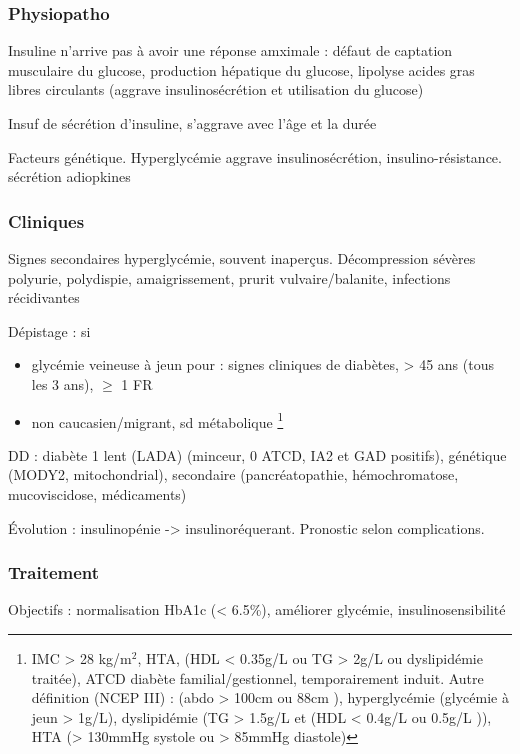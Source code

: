 \documentclass[11pt]{article}
\begin{document}
\subsubsection{Physiopatho}
\label{sec:org3b53937}
Insuline n'arrive pas à avoir une réponse amximale : défaut de captation
musculaire du glucose, \inc production hépatique du glucose, lipolyse \inc acides gras
libres circulants \thus (aggrave \dec insulinosécrétion et utilisation du glucose)

Insuf de sécrétion d'insuline, s'aggrave avec l'âge et la durée

Facteurs génétique. Hyperglycémie aggrave insulinosécrétion,
insulino-résistance. \dec sécrétion adiopkines

\subsubsection{Cliniques}
\label{sec:org6215526}
Signes secondaires hyperglycémie, souvent inaperçus. Décompression sévères \thus
polyurie, polydispie, amaigrissement, prurit vulvaire/balanite, infections
récidivantes

Dépistage : si
\begin{itemize}
\item glycémie veineuse à jeun pour : signes cliniques de diabètes, > 45 ans (tous les 3 ans), \(\ge\) 1 FR
\item non caucasien/migrant, sd métabolique \footnote{IMC > 28 kg/m\(^{\text{2}}\), HTA, (HDL < 0.35g/L ou
  TG > 2g/L ou dyslipidémie traitée), ATCD diabète familial/gestionnel,
  temporairement induit.
Autre définition (NCEP III) : (\diameter abdo > 100cm \male ou 88cm \female), hyperglycémie
  (glycémie à jeun > 1g/L), dyslipidémie (TG > 1.5g/L et (HDL < 0.4g/L \male ou
  0.5g/L \female)), HTA (> 130mmHg systole ou > 85mmHg diastole)}
\end{itemize}

DD : diabète 1 lent (LADA) (minceur, 0 ATCD, IA2 et GAD positifs), génétique
(MODY2, mitochondrial), secondaire (pancréatopathie, hémochromatose,
mucoviscidose, médicaments)

Évolution : insulinopénie -> insulinoréquerant. Pronostic selon complications.

\subsubsection{Traitement}
\label{sec:org40d1df2}
Objectifs : normalisation HbA1c (< 6.5\%), améliorer glycémie, insulinosensibilité
\end{document}
